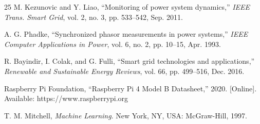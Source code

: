 \documentclass[journal]{IEEEtran}
\begin{document}
\begin{thebibliography}{25}
M. Kezunovic and Y. Liao, ``Monitoring of power system dynamics,'' \emph{IEEE Trans. Smart Grid}, vol. 2, no. 3, pp. 533--542, Sep. 2011.

A. G. Phadke, ``Synchronized phasor measurements in power systems,'' \emph{IEEE Computer Applications in Power}, vol. 6, no. 2, pp. 10--15, Apr. 1993.

R. Bayindir, I. Colak, and G. Fulli, ``Smart grid technologies and applications,'' \emph{Renewable and Sustainable Energy Reviews}, vol. 66, pp. 499--516, Dec. 2016.

Raspberry Pi Foundation, ``Raspberry Pi 4 Model B Datasheet,'' 2020. [Online]. Available: https://www.raspberrypi.org

T. M. Mitchell, \emph{Machine Learning}. New York, NY, USA: McGraw-Hill, 1997.

\end{thebibliography}
\end{document}
